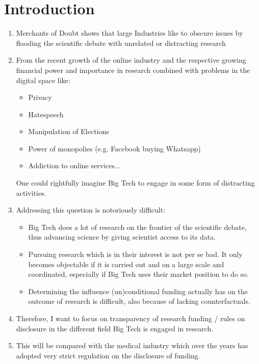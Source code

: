 \section*{Introduction}

\begin{enumerate}
    \item Merchants of Doubt shows that large Industries like to obscure issues by flooding the scientific debate with unrelated or distracting research
    \item From the recent growth of the online industry and the respective growing financial power and importance in research combined with problems in the digital space like: \begin{itemize}
        \item Privacy
        \item Hatespeech
        \item Manipulation of Elections 
        \item Power of monopolies (e.g. Facebook buying Whatsapp)
        \item Addiction to online services...
    \end{itemize} One could rightfully imagine Big Tech to engage in some form of distracting activities. 
    \item Addressing this question is notoriously difficult:\begin{itemize}
        \item Big Tech does a lot of research on the frontier of the scientific debate, thus advancing science by giving scientist access to its data.
        \item Pursuing research which is in their interest is not per se bad. It only becomes objectable if it is carried out and on a large scale and coordinated, especially if Big Tech uses their market position to do so. 
        \item Determining the influence (un)conditional funding actually has on the outcome of research is difficult, also because of lacking counterfactuals. 
    \end{itemize} 
    \item Therefore, I want to focus on transparency of research funding / rules on disclosure in the different field Big Tech is engaged in research.
    \item This will be compared with the medical industry which over the years has adopted very strict regulation on the disclosure of funding.
\end{enumerate}

